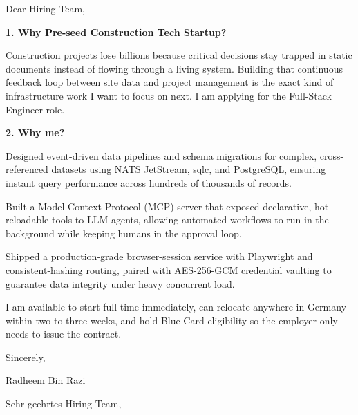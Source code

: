 \documentclass[11pt,a4paper]{coverletter}
\begin{document}

\opening{Dear Hiring Team,}

\vspace{8pt}\noindent\textbf{1. Why Pre-seed Construction Tech Startup?}\par\vspace{3pt}

Construction projects lose billions because critical decisions stay trapped in static documents instead of flowing through a living system. Building that continuous feedback loop between site data and project management is the exact kind of infrastructure work I want to focus on next. I am applying for the Full-Stack Engineer role.

\vspace{8pt}\noindent\textbf{2. Why me?}\par\vspace{3pt}

\bullets

  \item Designed event-driven data pipelines and schema migrations for complex, cross-referenced datasets using NATS JetStream, sqlc, and PostgreSQL, ensuring instant query performance across hundreds of thousands of records.

  \item Built a Model Context Protocol (MCP) server that exposed declarative, hot-reloadable tools to LLM agents, allowing automated workflows to run in the background while keeping humans in the approval loop.

  \item Shipped a production-grade browser-session service with Playwright and consistent-hashing routing, paired with AES-256-GCM credential vaulting to guarantee data integrity under heavy concurrent load.

\bulletsend

I am available to start full-time immediately, can relocate anywhere in Germany within two to three weeks, and hold Blue Card eligibility so the employer only needs to issue the contract.

\closing{Sincerely,}{Radheem Bin Razi}

\clearpage
{}


\opening{Sehr geehrtes Hiring-Team,}
\end{document}
